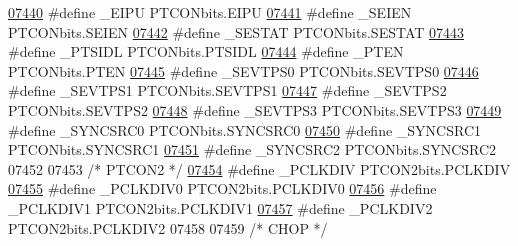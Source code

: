 \begin{DoxyCode}
\hypertarget{a00009_source_l07440}{}\hyperlink{a00009_a2086b1490a41d4478e1c52323d4c8988}{07440} \textcolor{preprocessor}{#define \_EIPU PTCONbits.EIPU}
\hypertarget{a00009_source_l07441}{}\hyperlink{a00009_ab1e8ad2a6ffd055ab674686fecc4279d}{07441} \textcolor{preprocessor}{#define \_SEIEN PTCONbits.SEIEN}
\hypertarget{a00009_source_l07442}{}\hyperlink{a00009_a90c824b0bfabfb02911e86dd0ec11b12}{07442} \textcolor{preprocessor}{#define \_SESTAT PTCONbits.SESTAT}
\hypertarget{a00009_source_l07443}{}\hyperlink{a00009_a3ac4db750e7d86cae991f49c861ce05b}{07443} \textcolor{preprocessor}{#define \_PTSIDL PTCONbits.PTSIDL}
\hypertarget{a00009_source_l07444}{}\hyperlink{a00009_afb75f021998cbc03eee8058f7a46c96a}{07444} \textcolor{preprocessor}{#define \_PTEN PTCONbits.PTEN}
\hypertarget{a00009_source_l07445}{}\hyperlink{a00009_a043501790954685d949022c30fd40206}{07445} \textcolor{preprocessor}{#define \_SEVTPS0 PTCONbits.SEVTPS0}
\hypertarget{a00009_source_l07446}{}\hyperlink{a00009_a56ab3ff6ef6d2bc375fe9a828026dec0}{07446} \textcolor{preprocessor}{#define \_SEVTPS1 PTCONbits.SEVTPS1}
\hypertarget{a00009_source_l07447}{}\hyperlink{a00009_a87ea00097e256416c2fdbc56e9e00c02}{07447} \textcolor{preprocessor}{#define \_SEVTPS2 PTCONbits.SEVTPS2}
\hypertarget{a00009_source_l07448}{}\hyperlink{a00009_ad755e6ada210afb9980e1e76304ac24a}{07448} \textcolor{preprocessor}{#define \_SEVTPS3 PTCONbits.SEVTPS3}
\hypertarget{a00009_source_l07449}{}\hyperlink{a00009_a9e16fd68bdf77b6f43e5e02fbd82c345}{07449} \textcolor{preprocessor}{#define \_SYNCSRC0 PTCONbits.SYNCSRC0}
\hypertarget{a00009_source_l07450}{}\hyperlink{a00009_a8f8391ca63f533abc501fe7fad71938f}{07450} \textcolor{preprocessor}{#define \_SYNCSRC1 PTCONbits.SYNCSRC1}
\hypertarget{a00009_source_l07451}{}\hyperlink{a00009_a3818ad87a079894f1df204f42d98a6e9}{07451} \textcolor{preprocessor}{#define \_SYNCSRC2 PTCONbits.SYNCSRC2}
07452 
07453 \textcolor{comment}{/* PTCON2 */}
\hypertarget{a00009_source_l07454}{}\hyperlink{a00009_a92eb607fef87c01864654243be658181}{07454} \textcolor{preprocessor}{#define \_PCLKDIV PTCON2bits.PCLKDIV}
\hypertarget{a00009_source_l07455}{}\hyperlink{a00009_acdbca7b9a3fc5d373e0e67f13d0b0078}{07455} \textcolor{preprocessor}{#define \_PCLKDIV0 PTCON2bits.PCLKDIV0}
\hypertarget{a00009_source_l07456}{}\hyperlink{a00009_a51ab34a69746a63ec0af77f4890036b4}{07456} \textcolor{preprocessor}{#define \_PCLKDIV1 PTCON2bits.PCLKDIV1}
\hypertarget{a00009_source_l07457}{}\hyperlink{a00009_a05052726e537bbf995f9d7986f71dcee}{07457} \textcolor{preprocessor}{#define \_PCLKDIV2 PTCON2bits.PCLKDIV2}
07458 
07459 \textcolor{comment}{/* CHOP */}

\end{DoxyCode}
